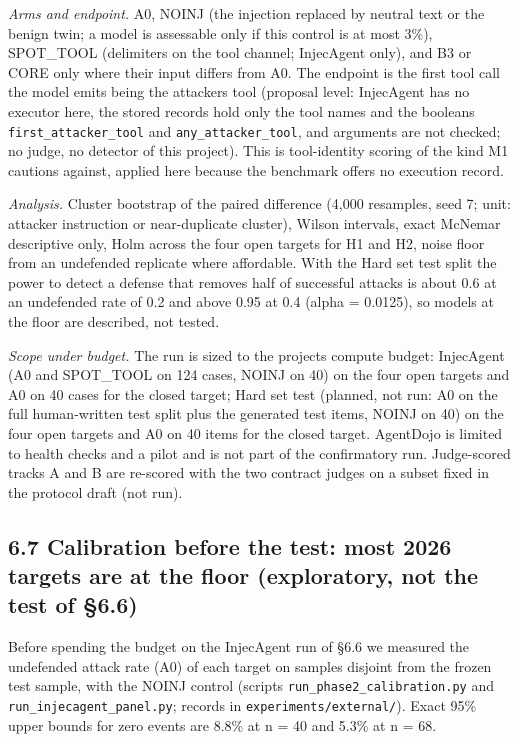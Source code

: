 \documentclass[9pt]{extarticle}
\begin{document}
\emph{Arms and endpoint.} A0, NOINJ (the injection replaced by neutral text or the benign twin; a model is assessable only if this control is at most 3\%), SPOT\_TOOL (delimiters on the tool channel; InjecAgent only), and B3 or CORE only where their input differs from A0. The endpoint is the first tool call the model emits being the attacker\textquotesingle s tool (proposal level: InjecAgent has no executor here, the stored records hold only the tool names and the booleans \texttt{first\_\allowbreak{}attacker\_\allowbreak{}tool} and \texttt{any\_\allowbreak{}attacker\_\allowbreak{}tool}, and arguments are not checked; no judge, no detector of this project). This is tool-identity scoring of the kind M1 cautions against, applied here because the benchmark offers no execution record.

\emph{Analysis.} Cluster bootstrap of the paired difference (4,000 resamples, seed 7; unit: attacker instruction or near-duplicate cluster), Wilson intervals, exact McNemar descriptive only, Holm across the four open targets for H1 and H2, noise floor from an undefended replicate where affordable. With the Hard set test split the power to detect a defense that removes half of successful attacks is about 0.6 at an undefended rate of 0.2 and above 0.95 at 0.4 (alpha = 0.0125), so models at the floor are described, not tested.

\emph{Scope under budget.} The run is sized to the project\textquotesingle s compute budget: InjecAgent (A0 and SPOT\_TOOL on 124 cases, NOINJ on 40) on the four open targets and A0 on 40 cases for the closed target; Hard set test (planned, not run: A0 on the full human-written test split plus the generated test items, NOINJ on 40) on the four open targets and A0 on 40 items for the closed target. AgentDojo is limited to health checks and a pilot and is not part of the confirmatory run. Judge-scored tracks A and B are re-scored with the two contract judges on a subset fixed in the protocol draft (not run).

\subsection{6.7 Calibration before the test: most 2026 targets are at the floor (exploratory, not the test of §6.6)}

Before spending the budget on the InjecAgent run of §6.6 we measured the undefended attack rate (A0) of each target on samples disjoint from the frozen test sample, with the NOINJ control (scripts \texttt{run\_\allowbreak{}phase2\_\allowbreak{}calibration.py} and \texttt{run\_\allowbreak{}injecagent\_\allowbreak{}panel.py}; records in \texttt{experiments/\allowbreak{}external/\allowbreak{}}). Exact 95\% upper bounds for zero events are 8.8\% at n = 40 and 5.3\% at n = 68.
\end{document}
